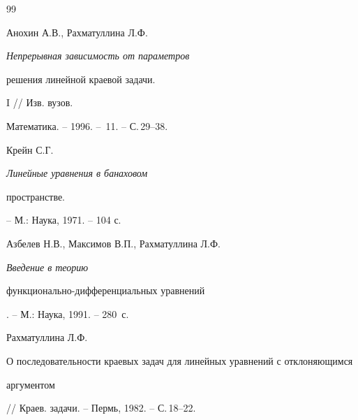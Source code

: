\begin{thebibliography}{99}







Анохин А.В., Рахматуллина Л.Ф.


{\em Непрерывная зависимость от параметров


решения линейной краевой задачи.} I // Изв. вузов.


Математика. -- 1996. -- \No\,11. -- С.\,29--38.




Крейн С.Г. {\em Линейные уравнения в банаховом 


пространстве.} -- М.: Наука, 1971. -- 104 с.




Азбелев Н.В., Максимов В.П., Рахматуллина Л.Ф. {\em Введение в теорию


функционально-дифференциальных уравнений}. -- М.: Наука, 1991. -- 280~с.




Рахматуллина Л.Ф. {\em


О последовательности краевых задач для линейных уравнений с отклоняющимся


аргументом} // Краев. задачи. -- Пермь, 1982. -- С.\,18--22.





\end{thebibliography}





\vskip 0.5cm












\label{end}





